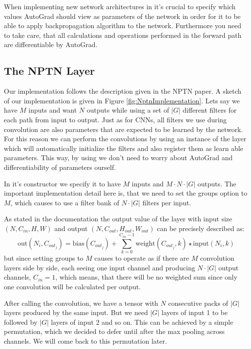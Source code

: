 \documentclass{llncs}
\begin{document}
When implementing new network architectures in \pytorch it's crucial to specify which values AutoGrad should view as parameters of the network in order for it to be able to apply backpropagation algorithm to the network. Furthermore you need to take care, that all calculations and operations performed in the forward path are differentiable by AutoGrad.
\subsection{The NPTN Layer}
Our implementation follows the description given in the NPTN paper. A sketch of our implementation is given in Figure \ref{fig:NptnImplementation}.
Lets say we have $M$ inputs and want $N$ outputs while using a set of $|G|$ different filters for each path from input to output.
Just as for CNNs, all filters we use during convolution are also parameters that are expected to be learned by the network.
For this reason we can perform the convolutions by using an instance of the \nnConvLayer layer which will automatically initialize the filters and also register them as learn able parameters. This way, by using \nnConvLayer we don't need to worry about AutoGrad and differentiability of parameters ourself.

In it's constructor we specify it to have $M$ inputs and $M \cdot N \cdot |G|$ outputs. The important implementation detail here is, that we need to set the groups option to $M$, which causes \nnConvLayer to use a filter bank of $N\cdot|G|$ filters per input.

As stated in the \pytorch documentation \cite{PyTorchDocumentation} the output value of the \nnConvLayer layer with input size $(N, C_{in}, H, W)$ and output $(N, C_{out}, H_{out}, W_{out})$ can be precisely described as:
\begin{equation*}
\text{out}(N_i, C_{out_j}) = \text{bias}(C_{out_j}) +
\sum_{k = 0}^{C_{in} - 1} \text{weight}(C_{out_j}, k) \star \text{input}(N_i, k)
\end{equation*}
but since setting groups to $M$ causes \nnConvLayer to operate as if there are $M$ convolution layers side by side, each seeing one input channel and producing $N\cdot|G|$ output channels, $C_{in} = 1$, which means, that there will be no weighted sum since only one convolution will be calculated per output.

After calling the convolution, we have a tensor with $N$ consecutive packs of $|G|$ layers produced by the same input. But we need $|G|$ layers of input 1 to be followed by $|G|$ layers of input 2 and so on. This can be achieved by a simple permutation, which we decided to defer until after the max pooling across channels. We will come back to this permutation later.
\end{document}
